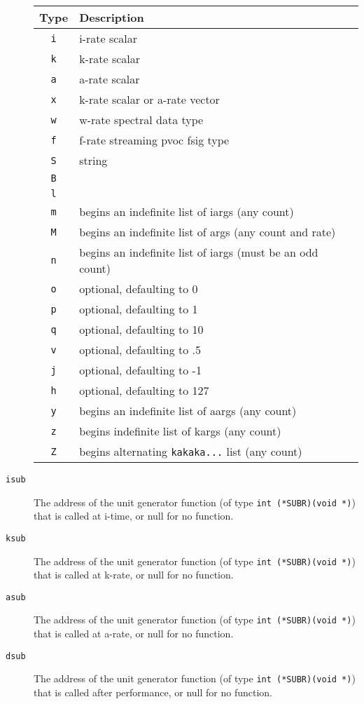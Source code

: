 \documentclass[10pt,letterpaper,onecolumn]{ltxguide}
\begin{document}
\begin{description}
			\begin{center}
			\begin{tabular*}{280pt}[t]{cl}
			Type & Description \\
			\hline
			\texttt{i} & i-rate scalar \\
			\texttt{k} & k-rate scalar \\
			\texttt{a} & a-rate scalar \\
			\texttt{x} & k-rate scalar or a-rate vector \\
			\texttt{w} & w-rate spectral data type \\
			\texttt{f} & f-rate streaming pvoc fsig type \\
			\texttt{S} & string \\
			\texttt{B} & \\
			\texttt{l} & \\
			\texttt{m} & begins an indefinite list of iargs (any count) \\
			\texttt{M} & begins an indefinite list of args (any count and rate) \\
			\texttt{n} & begins an indefinite list of iargs (must be an odd count) \\
			\texttt{o} & optional, defaulting to 0 \\
			\texttt{p} & optional, defaulting to 1 \\
			\texttt{q} & optional, defaulting to 10 \\
			\texttt{v} & optional, defaulting to .5 \\ 
			\texttt{j} & optional, defaulting to -1 \\
			\texttt{h} & optional, defaulting to 127 \\
			\texttt{y} & begins an indefinite list of aargs (any count) \\ 
			\texttt{z} & begins indefinite list of kargs (any count) \\
			\texttt{Z} & begins alternating \texttt{kakaka...} list (any count) \\
			\end{tabular*}
			\end{center}

	\item[\texttt{isub}] The address of the unit generator function (of type \texttt{int (*SUBR)(void *)}) that is called at i-time, or null for no function.
	\item[\texttt{ksub}] The address of the unit generator function (of type \texttt{int (*SUBR)(void *)}) that is called at k-rate, or null for no function.
	\item[\texttt{asub}] The address of the unit generator function (of type \texttt{int (*SUBR)(void *)}) that is called at a-rate, or null for no function.
	\item[\texttt{dsub}] The address of the unit generator function (of type \texttt{int (*SUBR)(void *)}) that is called after performance, or null for no function.

\end{description}
\end{document}
